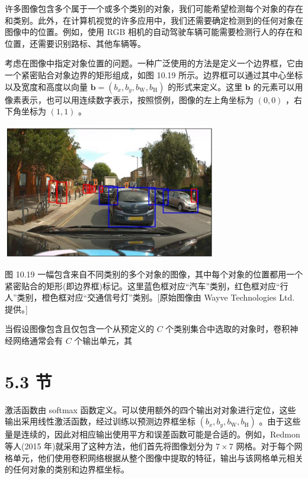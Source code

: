 \documentclass[10pt]{report}
\begin{document}
许多图像包含多个属于一个或多个类别的对象，我们可能希望检测每个对象的存在和类别。此外，在计算机视觉的许多应用中，我们还需要确定检测到的任何对象在图像中的位置。例如，使用 RGB 相机的自动驾驶车辆可能需要检测行人的存在和位置，还需要识别路标、其他车辆等。

考虑在图像中指定对象位置的问题。一种广泛使用的方法是定义一个边界框，它由一个紧密贴合对象边界的矩形组成，如图 10.19 所示。边界框可以通过其中心坐标以及宽度和高度以向量 \(\mathbf{b} = \left( {{b}_{x},{b}_{y},{b}_{\mathrm{W}},{b}_{\mathrm{H}}}\right)\) 的形式来定义。这里 \(\mathbf{b}\) 的元素可以用像素表示，也可以用连续数字表示，按照惯例，图像的左上角坐标为 \(\left( {0,0}\right)\) ，右下角坐标为 \(\left( {1,1}\right)\) 。

\begin{center}
\includegraphics[max width=0.7\textwidth]{images/0194e279-9b28-703a-88f4-c3ac21e2010d_329_590_347_890_562_0.jpg}
\end{center}
\hspace*{3em} 

图 10.19 一幅包含来自不同类别的多个对象的图像，其中每个对象的位置都用一个紧密贴合的矩形(即边界框)标记。这里蓝色框对应“汽车”类别，红色框对应“行人”类别，橙色框对应“交通信号灯”类别。[原始图像由 Wayve Technologies Ltd. 提供。]

当假设图像包含且仅包含一个从预定义的 \(C\) 个类别集合中选取的对象时，卷积神经网络通常会有 \(C\) 个输出单元，其

\section*{5.3 节}

激活函数由 softmax 函数定义。可以使用额外的四个输出对对象进行定位，这些输出采用线性激活函数，经过训练以预测边界框坐标 \(\left( {{b}_{x},{b}_{y},{b}_{\mathrm{W}},{b}_{\mathrm{H}}}\right)\) 。由于这些量是连续的，因此对相应输出使用平方和误差函数可能是合适的。例如，Redmon 等人(2015 年)就采用了这种方法，他们首先将图像划分为 \(7 \times  7\) 网格。对于每个网格单元，他们使用卷积网络根据从整个图像中提取的特征，输出与该网格单元相关的任何对象的类别和边界框坐标。
\end{document}
